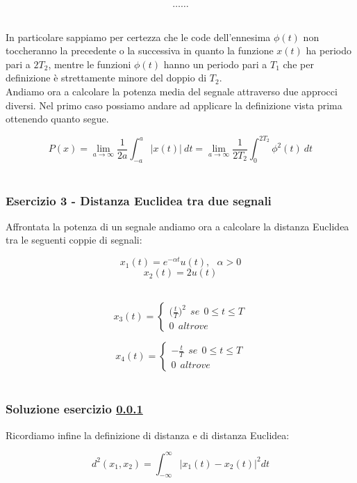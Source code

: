 \documentclass[../main.tex]{subfiles}
\begin{document}
\[ \dots     \dots\]\


In particolare sappiamo per certezza che le code dell'ennesima $\phi(t)$ non toccheranno la precedente o la successiva in quanto la funzione $x(t)$ ha periodo pari a $2T_2$, mentre le funzioni $\phi(t)$ hanno un periodo pari a $T_1$ che per definizione è strettamente minore del doppio di $T_2$.\\

Andiamo ora a calcolare la potenza media del segnale attraverso due approcci diversi.
Nel primo caso possiamo andare ad applicare la definizione vista prima ottenendo quanto segue.

\[ P(x) = \lim_{a\rightarrow\infty} \frac{1}{2a} \int_{-a}^a \big|x(t) \big| \: dt = \lim_{a\rightarrow\infty} \frac{1}{2T_2}\int_0^{2T_2} \phi^2(t) \:dt  \]\



\vspace*{1.5cm}
\subsubsection{Esercizio 3 - Distanza Euclidea tra due segnali}
\label{ss3}

Affrontata la potenza di un segnale andiamo ora a calcolare la distanza Euclidea tra le seguenti coppie di segnali:

\[ x_1(t) = e^{-\alpha t} u(t), \:\:\: \alpha > 0 \]
\[ x_2(t) = 2u(t)  \]\

\[ x_3(t) = \begin{cases}
	\big( \frac{t}{T}\big)^2\:\: \unit{se}\:\: 0 \leq t \leq T  \\
	0\:\: \unit{altrove}	
\end{cases} \]

\[ x_4(t) = \begin{cases}
	-\frac{t}{T}\:\: \unit{se}\:\: 0 \leq t \leq T  \\
	0\:\: \unit{altrove}	
\end{cases} \]\

\subsubsection*{Soluzione esercizio \ref{ss3}}

Ricordiamo infine la definizione di distanza e di distanza Euclidea:

\begin{equation}
	d^2(x_1,x_2) = \int_{-\infty}^\infty \big| x_1(t) - x_2(t)\big|^2 dt
\end{equation}
\end{document}
